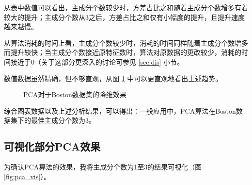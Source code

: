 \documentclass[12pt,a4paper]{article}
\theoremstyle{definition}
\begin{document}
从表中数值可以看出，主成分个数较少时，方差占比之和随着主成分个数增多有着较大的提升；主成分个数从3之后，方差占比之和仅有小幅度的提升，且提升速度越来越慢。

从算法消耗的时间上看，主成分个数较少时，消耗的时间同样随着主成分个数增多而提升较快；当主成分个数接近原特征数时，算法对原数据的更改较少，消耗的时间接近于0（关于这部分更深入的讨论可参见 \ref{sec:dis} 小节。

数值数据虽然精确，但不够直观，从图 \ref{fig::kline} 中可以更直观地看出上述趋势。

\begin{figure}[H]
	\centering
	\caption{PCA对于Boston数据集的降维效果}
	\label{fig::kline}
\end{figure}

综合图表数据以及上述分析结果，可以得出：一般应用中，PCA算法在Boston数据集下的最佳主成分个数为3。

\subsection{可视化部分PCA效果}

为确认PCA算法的效果，我将主成分个数为1至3的结果可视化（图 \ref{fig:pca_vis}）。
\end{document}
